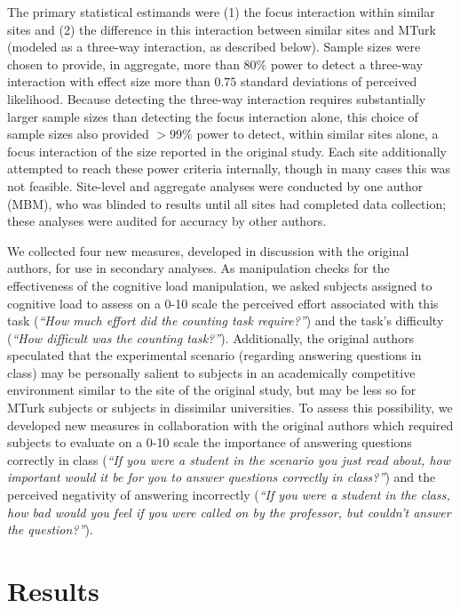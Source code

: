 \documentclass[english,floatsintext,man]{apa6}
\newcounter{author}
\theoremstyle{definition}
\theoremstyle{definition}
\theoremstyle{definition}
\theoremstyle{remark}
\begin{document}
The primary statistical estimands were (1) the focus interaction within
similar sites and (2) the difference in this interaction between similar
sites and MTurk (modeled as a three-way interaction, as described
below). Sample sizes were chosen to provide, in aggregate, more than
80\% power to detect a three-way interaction with effect size more than
\(0.75\) standard deviations of perceived likelihood. Because detecting
the three-way interaction requires substantially larger sample sizes
than detecting the focus interaction alone, this choice of sample sizes
also provided \(>99\%\) power to detect, within similar sites alone, a
focus interaction of the size reported in the original study. Each site
additionally attempted to reach these power criteria internally, though
in many cases this was not feasible. Site-level and aggregate analyses
were conducted by one author (MBM), who was blinded to results until all
sites had completed data collection; these analyses were audited for
accuracy by other authors.

We collected four new measures, developed in discussion with the
original authors, for use in secondary analyses. As manipulation checks
for the effectiveness of the cognitive load manipulation, we asked
subjects assigned to cognitive load to assess on a 0-10 scale the
perceived effort associated with this task (\emph{\enquote{How much
effort did the counting task require?}}) and the task's difficulty
(\emph{\enquote{How difficult was the counting task?}}). Additionally,
the original authors speculated that the experimental scenario
(regarding answering questions in class) may be personally salient to
subjects in an academically competitive environment similar to the site
of the original study, but may be less so for MTurk subjects or subjects
in dissimilar universities. To assess this possibility, we developed new
measures in collaboration with the original authors which required
subjects to evaluate on a 0-10 scale the importance of answering
questions correctly in class (\emph{\enquote{If you were a student in
the scenario you just read about, how important would it be for you to
answer questions correctly in class?}}) and the perceived negativity of
answering incorrectly (\emph{\enquote{If you were a student in the
class, how bad would you feel if you were called on by the professor,
but couldn't answer the question?}}).

\section{Results}\label{results}
\end{document}
